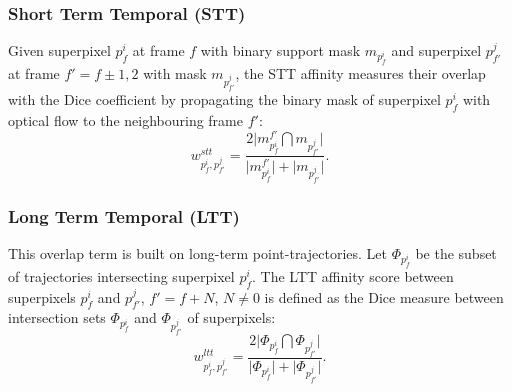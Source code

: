\subsubsection*{Short Term Temporal (STT)}
Given superpixel $p_f^i$ at frame $f$ with binary support mask $m_{p_f^i}$ and superpixel $p_{f'}^j$ at frame $f' = f\pm1,2$ with mask $m_{p_{f'}^j}$, the STT affinity measures their overlap with the Dice coefficient by propagating the
 binary mask of superpixel $p_f^i$ with optical flow to the neighbouring frame $f'$:
\begin{equation*}
  w^{stt}_{p_f^i,p_{f'}^j}=\frac{2 \bigr \rvert m^{f'}_{p_f^i} \bigcap m_{p_{f'}^j} \bigl \lvert}{\bigr \rvert m^{f'}_{p_f^i}  \bigl \lvert+ \bigr \rvert m_{p_{f'}^j}  \bigl \lvert}.
\end{equation*}
\subsubsection*{Long Term Temporal (LTT)}
This overlap term is built on long-term point-trajectories. Let $\varPhi_{p_f^i}$ be the subset of trajectories intersecting superpixel $p_f^i$. The LTT affinity score between superpixels $p_f^i$ and $p_{f'}^j$,
$f' = f+N$, $N\neq 0$ is defined as the Dice measure between intersection sets $\varPhi_{p_f^i}$ and $\varPhi_{p_{f'}^j}$ of superpixels:
\begin{equation*}
  w^{ltt}_{p_f^i,p_{f'}^j}=\frac{2 \bigr \rvert \varPhi_{p_f^i} \bigcap \varPhi_{p_{f'}^j} \bigl \lvert}{\bigr \rvert\varPhi_{p_f^i}\bigl \lvert+ \bigr \rvert \varPhi_{p_{f'}^j} \bigl \lvert}.
\end{equation*}
